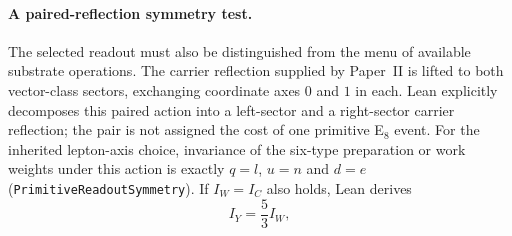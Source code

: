 \paragraph{A paired-reflection symmetry test.} The selected readout must also be distinguished from the menu of available substrate operations. The carrier reflection supplied by Paper~II is lifted to both vector-class sectors, exchanging coordinate axes $0$ and $1$ in each. Lean explicitly decomposes this paired action into a left-sector and a right-sector carrier reflection; the pair is not assigned the cost of one primitive E$_8$ event. For the inherited lepton-axis choice, invariance of the six-type preparation or work weights under this action is exactly $q=l$, $u=n$ and $d=e$ (\texttt{PrimitiveReadoutSymmetry}). If $I_W=I_C$ also holds, Lean derives
\begin{equation}
 I_Y=\frac53 I_W,
\end{equation}
